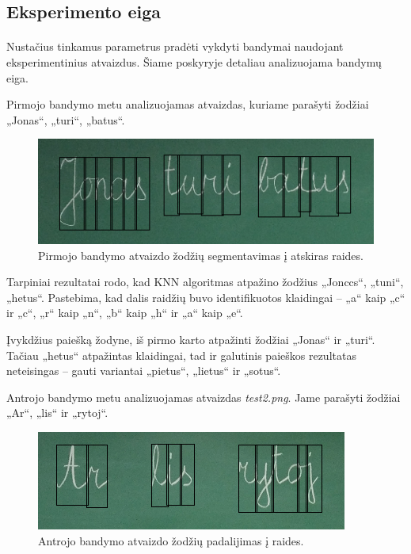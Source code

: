 \documentclass[a4paper,12pt]{article}
\begin{document}
\subsection{Eksperimento eiga}
\paragraph{} Nustačius tinkamus parametrus pradėti vykdyti bandymai naudojant eksperimentinius atvaizdus. Šiame poskyryje detaliau analizuojama bandymų eiga.

Pirmojo bandymo metu analizuojamas atvaizdas, kuriame parašyti žodžiai „Jonas“, „turi“, „batus“.
	\begin{figure}[H]
		\centering
		\includegraphics[scale=0.6]{images/test1}
		\caption{Pirmojo bandymo atvaizdo žodžių segmentavimas į atskiras raides.}   %
		\label{img:test1}
	\end{figure}

Tarpiniai rezultatai rodo, kad KNN algoritmas atpažino žodžius „Jonccs“, „tuni“, „hetus“. Pastebima, kad dalis raidžių buvo identifikuotos klaidingai – „a“ kaip „c“ ir „c“, „r“ kaip „n“, „b“ kaip „h“ ir „a“ kaip „e“.

Įvykdžius paiešką žodyne, iš pirmo karto atpažinti žodžiai „Jonas“ ir „turi“. Tačiau „hetus“ atpažintas klaidingai, tad ir galutinis paieškos rezultatas neteisingas – gauti variantai „pietus“, „lietus“ ir „sotus“.

Antrojo bandymo metu analizuojamas atvaizdas \textit{test2.png}. Jame parašyti žodžiai „Ar“, „lis“ ir „rytoj“.
	\begin{figure}[H]
		\centering
		\includegraphics[scale=0.6]{images/test2}
		\caption{Antrojo bandymo atvaizdo žodžių padalijimas į raides.}   %
		\label{img:test2}
	\end{figure}
\end{document}
